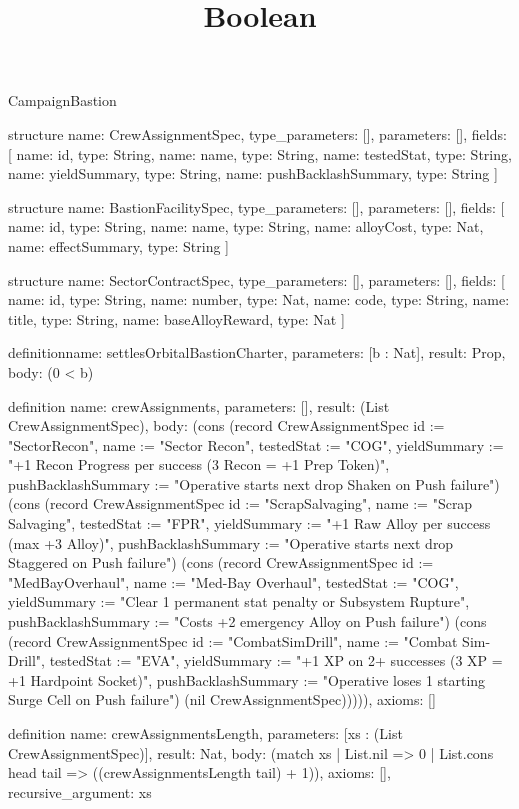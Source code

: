 \begin{lexlean}{CampaignBastion}
\title{Boolean}
\begin{semanticmodule}
structure{
  name: CrewAssignmentSpec,
  type_parameters: [],
  parameters: [],
  fields: [
    {name: id, type: String},
    {name: name, type: String},
    {name: testedStat, type: String},
    {name: yieldSummary, type: String},
    {name: pushBacklashSummary, type: String}
  ]
}

structure{
  name: BastionFacilitySpec,
  type_parameters: [],
  parameters: [],
  fields: [
    {name: id, type: String},
    {name: name, type: String},
    {name: alloyCost, type: Nat},
    {name: effectSummary, type: String}
  ]
}

structure{
  name: SectorContractSpec,
  type_parameters: [],
  parameters: [],
  fields: [
    {name: id, type: String},
    {name: number, type: Nat},
    {name: code, type: String},
    {name: title, type: String},
    {name: baseAlloyReward, type: Nat}
  ]
}

definition{name: settlesOrbitalBastionCharter, parameters: [b : Nat], result: Prop, body: (0 < b)}

definition{
  name: crewAssignments,
  parameters: [],
  result: (List CrewAssignmentSpec),
  body: (cons (record CrewAssignmentSpec {id := "SectorRecon", name := "Sector Recon", testedStat := "COG", yieldSummary := "+1 Recon Progress per success (3 Recon = +1 Prep Token)", pushBacklashSummary := "Operative starts next drop Shaken on Push failure"}) (cons (record CrewAssignmentSpec {id := "ScrapSalvaging", name := "Scrap Salvaging", testedStat := "FPR", yieldSummary := "+1 Raw Alloy per success (max +3 Alloy)", pushBacklashSummary := "Operative starts next drop Staggered on Push failure"}) (cons (record CrewAssignmentSpec {id := "MedBayOverhaul", name := "Med-Bay Overhaul", testedStat := "COG", yieldSummary := "Clear 1 permanent stat penalty or Subsystem Rupture", pushBacklashSummary := "Costs +2 emergency Alloy on Push failure"}) (cons (record CrewAssignmentSpec {id := "CombatSimDrill", name := "Combat Sim-Drill", testedStat := "EVA", yieldSummary := "+1 XP on 2+ successes (3 XP = +1 Hardpoint Socket)", pushBacklashSummary := "Operative loses 1 starting Surge Cell on Push failure"}) (nil CrewAssignmentSpec))))),
  axioms: []
}

definition{
  name: crewAssignmentsLength,
  parameters: [xs : (List CrewAssignmentSpec)],
  result: Nat,
  body: (match xs
    | List.nil => 0
    | List.cons head tail => ((crewAssignmentsLength tail) + 1)),
  axioms: [],
  recursive_argument: xs
}


\end{semanticmodule}
\end{lexlean}
